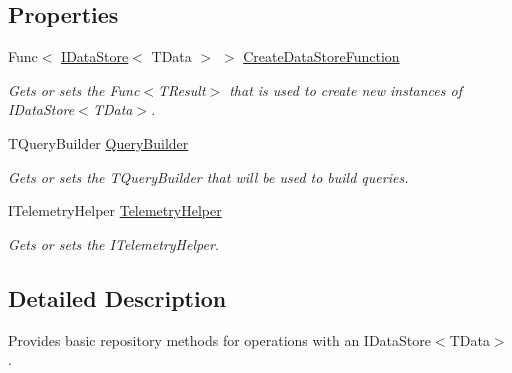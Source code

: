 \subsection*{Properties}
\begin{DoxyCompactItemize}
\item 
Func$<$ \hyperlink{interfaceCqrs_1_1DataStores_1_1IDataStore}{I\+Data\+Store}$<$ T\+Data $>$ $>$ \hyperlink{classCqrs_1_1Repositories_1_1Repository_ae15cee6394a223564ad2ead65cd30189_ae15cee6394a223564ad2ead65cd30189}{Create\+Data\+Store\+Function}
\begin{DoxyCompactList}\small\item\em Gets or sets the Func$<$\+T\+Result$>$ that is used to create new instances of I\+Data\+Store$<$\+T\+Data$>$. \end{DoxyCompactList}\item 
T\+Query\+Builder \hyperlink{classCqrs_1_1Repositories_1_1Repository_a4447451b7dbcfcd68dfa3fa65a41f357_a4447451b7dbcfcd68dfa3fa65a41f357}{Query\+Builder}
\begin{DoxyCompactList}\small\item\em Gets or sets the {\itshape T\+Query\+Builder}  that will be used to build queries. \end{DoxyCompactList}\item 
I\+Telemetry\+Helper \hyperlink{classCqrs_1_1Repositories_1_1Repository_aae263dc1dda61f89c011be6d578620bd_aae263dc1dda61f89c011be6d578620bd}{Telemetry\+Helper}
\begin{DoxyCompactList}\small\item\em Gets or sets the I\+Telemetry\+Helper. \end{DoxyCompactList}\end{DoxyCompactItemize}


\subsection{Detailed Description}
Provides basic repository methods for operations with an I\+Data\+Store$<$\+T\+Data$>$. 


